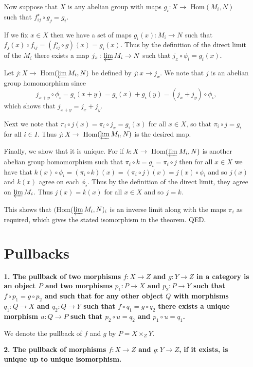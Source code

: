 \documentclass[12pt]{article}
\begin{document}
Now suppose that $X$ is any abelian group with maps $g_i : X \to$ Hom$(M_i, N)$ such that $f^\star_{ij}\circ g_j = g_i$.

If we fix $x \in X$ then we have a set of maps $g_i(x) : M_i \to N$ such that $f_j(x)\circ f_{ij} = (f^\star_{ij}\circ g)(x) = g_i(x)$. Thus by the definition of the direct limit of the $M_i$ there exists a map $j_x : \varprojlim M_i \to N$ such that $j_x\circ \phi_i = g_i(x)$.

Let $j : X \to$ Hom$(\varprojlim M_i, N)$ be defined by $j : x \to j_x$. We note that $j$ is an abelian group homomorphism since
$$j_{x + y}\circ \phi_i = g_i(x + y) = g_i(x) + g_i(y) = (j_x + j_y)\circ \phi_i,$$
which shows that $j_{x + y} = j_x + j_y$.

Next we note that $\pi_i\circ j(x) = \pi_i\circ j_x = g_i(x)$ for all $x \in X$, so that $\pi_i\circ j = g_i$ for all $i \in I$. Thus $j : X \to$ Hom$(\varprojlim M_i, N)$ is the desired map.

Finally, we show that it is unique. For if $k : X \to$ Hom$(\varprojlim M_i, N)$ is another abelian group homomorphism such that $\pi_i\circ k = g_i = \pi_i\circ j$ then for all $x \in X$ we have that $k(x)\circ \phi_i = (\pi_i\circ k)(x) = (\pi_i\circ j)(x) = j(x)\circ \phi_i$ and so $j(x)$ and $k(x)$ agree on each $\phi_i$. Thus by the definition of the direct limit, they agree on $\varprojlim M_i$. Thus $j(x) = k(x)$ for all $x \in X$ and so $j = k$.

This shows that $($Hom($\varprojlim M_i, N)_i$ is an inverse limit along with the maps $\pi_i$ as required, which gives the stated isomorphism in the theorem. QED.

\section{Pullbacks}

\textbf{1. The pullback of two morphisms $f : X \to Z$ and $g : Y \to Z$ in a category is an object $P$ and two morphisms $p_1 : P \to X$ and $p_2 : P \to Y$ such that $f\circ p_1 = g\circ p_2$ and such that for any other object $Q$ with morphisms $q_1 : Q \to X$ and $q_2 : Q \to Y$ such that $f\circ q_1 = g\circ q_2$ there exists a unique morphism $u : Q \to P$ such that $p_2\circ u = q_2$ and $p_1\circ u = q_1$.}

We denote the pullback of $f$ and $g$ by $P = X\times_Z Y$.

\textbf{2. The pullback of morphisms $f : X \to Z$ and $g : Y \to Z$, if it exists, is unique up to unique isomorphism.}
\end{document}

